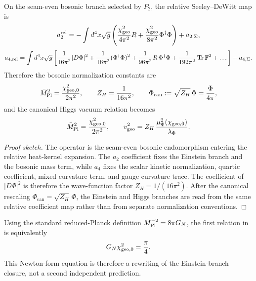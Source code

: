 \begin{proposition}
\label{prop:canonical-bosonic-normalization}
On the seam-even bosonic branch selected by $P_2$, the relative Seeley--DeWitt map is
\begin{equation}
\label{eq:relative-a2}
\begin{aligned}
a_2^{\mathrm{rel}}
=
-\int d^4x\sqrt g
\left(
\frac{\chi_{\mathrm{geo}}^2}{4\pi^2}R
+
\frac{\chi_{\mathrm{geo}}^2}{8\pi^2}\Phi^\dagger\Phi
\right)
+
a_{2,\Sigma},
\end{aligned}
\end{equation}
\begin{equation}
\label{eq:relative-a4}
\begin{aligned}
a_{4,\mathrm{rel}}
=
\int d^4x\sqrt g
\left[
\frac{1}{16\pi^2}|D\Phi|^2
+
\frac{1}{16\pi^2}(\Phi^\dagger\Phi)^2
+
\frac{1}{96\pi^2}R\,\Phi^\dagger\Phi
+
\frac{1}{192\pi^2}\operatorname{Tr}\mathbb F^2
+\dots
\right]
+
a_{4,\Sigma}.
\end{aligned}
\end{equation}
Therefore the bosonic normalization constants are
\[
\bar M_{\mathrm{Pl}}^2=\frac{\chi_{\mathrm{geo},0}^2}{2\pi^2},
\qquad
Z_H=\frac{1}{16\pi^2},
\qquad
\Phi_{\mathrm{can}}:=\sqrt{Z_H}\,\Phi=\frac{\Phi}{4\pi},
\]
and the canonical Higgs vacuum relation becomes
\begin{equation}
\label{eq:induced-einstein}
\bar M_{\mathrm{Pl}}^2=\frac{\chi_{\mathrm{geo},0}^2}{2\pi^2},
\qquad
v_{\mathrm{geo}}^2=Z_H\,\frac{\mu_\Phi^2(\chi_{\mathrm{geo},0})}{\lambda_\Phi}.
\end{equation}
\end{proposition}

\begin{proof}[Proof sketch]
The operator  is the seam-even bosonic endomorphism entering the relative heat-kernel expansion. The $a_2$ coefficient fixes the Einstein branch and the bosonic mass term, while $a_4$ fixes the scalar kinetic normalization, quartic coefficient, mixed curvature term, and gauge curvature trace. The coefficient of $|D\Phi|^2$ is therefore the wave-function factor $Z_H=1/(16\pi^2)$. After the canonical rescaling $\Phi_{\mathrm{can}}=\sqrt{Z_H}\,\Phi$, the Einstein and Higgs branches are read from the same relative coefficient map rather than from separate normalization conventions.
\end{proof}

\begin{remark}
Using the standard reduced-Planck definition $\bar M_{\mathrm{Pl}}^{-2}=8\pi G_N$, the first relation in  is equivalently
\[
G_N\chi_{\mathrm{geo},0}^2=\frac{\pi}{4}.
\]
This Newton-form equation is therefore a rewriting of the Einstein-branch closure, not a second independent prediction.
\end{remark}

